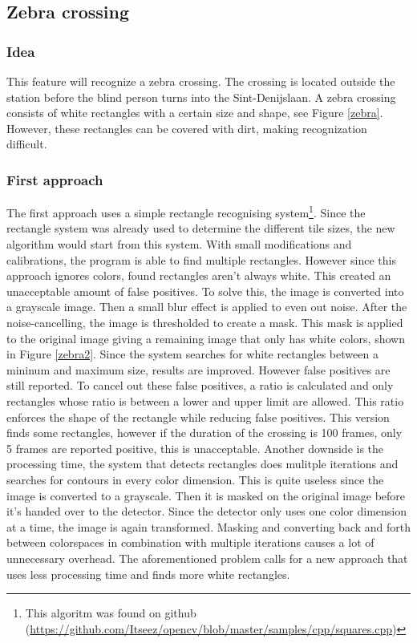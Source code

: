 \clearpage
\subsection{Zebra crossing}
\label{zebrasection}
\subsubsection{Idea}
This feature will recognize a zebra crossing. The crossing is located outside the station before the blind person turns into the Sint-Denijslaan.
A zebra crossing consists of white rectangles with a certain size and shape, see Figure \ref{zebra}. However, these rectangles can be covered with dirt, making recognization difficult.
{}

\subsubsection{First approach}
The first approach uses a simple rectangle recognising system\footnote{This algoritm was found on github (\url{https://github.com/Itseez/opencv/blob/master/samples/cpp/squares.cpp})}.
Since the rectangle system was already used to determine the different tile sizes, the new algorithm would start from this system. With small modifications and calibrations, the program is able to find multiple rectangles. However since this approach ignores colors, found rectangles aren't always white. This created an unacceptable amount of false positives.
\npar
To solve this, the image is converted into a grayscale image. Then a small blur effect is applied to even out noise. After the noise-cancelling, the image is thresholded to create a mask. This mask is applied to the original image giving a remaining image that only has white colors, shown in Figure \ref{zebra2}.
\npar
{}
\clearpage
Since the system searches for white rectangles between a mininum and maximum size, results are improved. However false positives are still reported. To cancel out these false positives, a ratio is calculated and only rectangles whose ratio is between a lower and upper limit are allowed. This ratio enforces the shape of the rectangle while reducing false positives.
\npar
This version finds some rectangles, however if the duration of the crossing is 100 frames, only 5 frames are reported positive, this is unacceptable. Another downside is the processing time, the system that detects rectangles does mulitple iterations and searches for contours in every color dimension. This is quite useless since the image is converted to a grayscale. Then it is masked on the original image before it's handed over to the detector. Since the detector only uses one color dimension at a time, the image is again transformed. Masking and converting back and forth between colorspaces in combination with multiple iterations causes a lot of unnecessary overhead. The aforementioned problem calls for a new approach that uses less processing time and finds more white rectangles.

